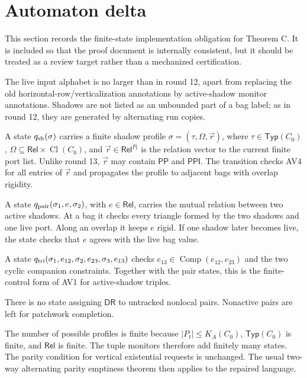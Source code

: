 \documentclass[11pt]{article}
\newcommand{\Rel}{\mathsf{Rel}}
\newcommand{\PP}{\mathsf{PP}}
\newcommand{\PPI}{\mathsf{PPI}}
\newcommand{\DR}{\mathsf{DR}}
\newcommand{\Comp}{\operatorname{Comp}}
\newcommand{\Cl}{\operatorname{Cl}}
\newcommand{\Typ}{\mathsf{Typ}}
\begin{document}
\section{Automaton delta}

This section records the finite-state implementation obligation for Theorem C.
It is included so that the proof document is internally consistent, but it
should be treated as a review target rather than a mechanized certification.

The live input alphabet is no larger than in round 12, apart from replacing the
old horizontal-row/verticalization annotations by active-shadow monitor
annotations.  Shadows are not listed as an unbounded part of a bag label; as in
round 12, they are generated by alternating run copies.

\begin{description}[leftmargin=3.2cm,style=nextline]
\item[Single-shadow states.]
A state \(q_{\rm sh}(\sigma)\) carries a finite shadow profile
\(\sigma=(\tau,\Omega,\vec r)\), where \(\tau\in\Typ(C_0)\),
\(\Omega\subseteq\Rel\times\Cl(C_0)\), and \(\vec r\in\Rel^{P_t}\) is the
relation vector to the current finite port list.  Unlike round 13,
\(\vec r\) may contain \(\PP\) and \(\PPI\).  The transition checks AV4 for all
entries of \(\vec r\) and propagates the profile to adjacent bags with overlap
rigidity.

\item[Pair states.]
A state \(q_{\rm pair}(\sigma_1,e,\sigma_2)\), with \(e\in\Rel\), carries the
mutual relation between two active shadows.  At a bag it checks every triangle
formed by the two shadows and one live port.  Along an overlap it keeps \(e\)
rigid.  If one shadow later becomes live, the state checks that \(e\) agrees
with the live bag value.

\item[Triple states.]
A state \(q_{\rm tri}(\sigma_1,e_{12},\sigma_2,e_{23},\sigma_3,e_{13})\) checks
\(e_{13}\in\Comp(e_{12},e_{23})\) and the two cyclic companion constraints.
Together with the pair states, this is the finite-control form of AV1 for
active-shadow triples.

\item[No default state.]
There is no state assigning \(\DR\) to untracked nonlocal pairs.  Nonactive
pairs are left for patchwork completion.
\end{description}

The number of possible profiles is finite because \(|P_t|\le K_A(C_0)\),
\(\Typ(C_0)\) is finite, and \(\Rel\) is finite.  The tuple monitors therefore
add finitely many states.  The parity condition for vertical existential
requests is unchanged.  The usual two-way alternating parity emptiness theorem
then applies to the repaired language.
\end{document}
